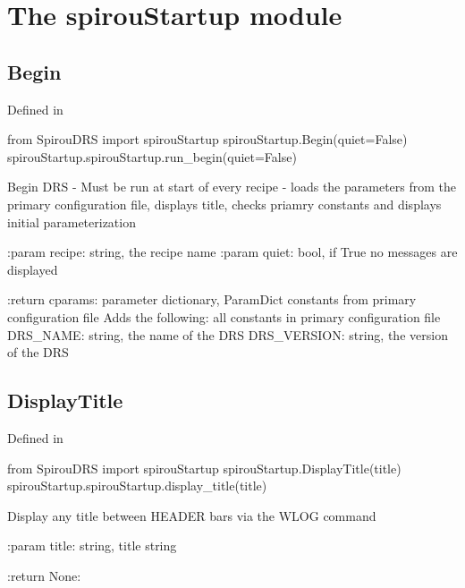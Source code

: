 
\clearpage
\newpage
\noindent\begin{minipage}{\textwidth}
\section{The spirouStartup module}
\label{ch:the_module:spirouStartup}

\subsection{Begin}

Defined in \spirouStartup{}

\begin{pythonbox}
from SpirouDRS import spirouStartup
spirouStartup.Begin(quiet=False)
spirouStartup.spirouStartup.run_begin(quiet=False)
\end{pythonbox}

\begin{pythondocstring}
Begin DRS - Must be run at start of every recipe
- loads the parameters from the primary configuration file, displays
  title, checks priamry constants and displays initial parameterization

:param recipe: string, the recipe name
:param quiet: bool, if True no messages are displayed

:return cparams: parameter dictionary, ParamDict constants from primary
                 configuration file
        Adds the following:
            all constants in primary configuration file
            DRS_NAME: string, the name of the DRS
            DRS_VERSION: string, the version of the DRS
\end{pythondocstring}
\end{minipage}

\noindent\begin{minipage}{\textwidth}
\subsection{DisplayTitle}

Defined in \spirouStartup{}

\begin{pythonbox}
from SpirouDRS import spirouStartup
spirouStartup.DisplayTitle(title)
spirouStartup.spirouStartup.display_title(title)
\end{pythonbox}

\begin{pythondocstring}
Display any title between HEADER bars via the WLOG command

:param title: string, title string

:return None:
\end{pythondocstring}
\end{minipage}

